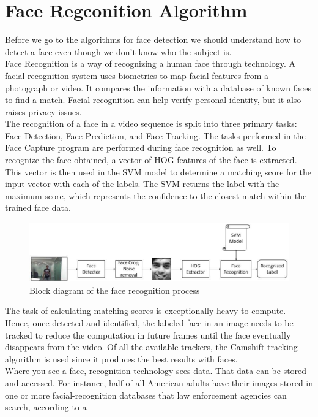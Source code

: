 \section{Face Regconition Algorithm}
    Before we go to the algorithms for face detection we should understand how to detect a face even though we don't know who the subject is. \\
    \vspace{3mm}
    Face Recognition is a way of recognizing a human face through technology. A facial recognition system uses biometrics to map facial features from a photograph or video. 
    It compares the information with a database of known faces to find a match. Facial recognition can help verify personal identity, but it also raises privacy issues. \\ 
    \vspace{3mm}
    The recognition of a face in a video sequence is split into three primary tasks: Face Detection, Face Prediction, and Face Tracking. The tasks performed in the Face Capture 
    program are performed during face recognition as well. To recognize the face obtained, a vector of HOG features of the face is extracted. This vector is then used in the SVM 
    model to determine a matching score for the input vector with each of the labels. The SVM returns the label with the maximum score, which represents the confidence to the 
    closest match within the trained face data. 
    \begin{figure}[H]
        \centering
        \includegraphics[width=0.6\linewidth]{img/face-recognition.jpg}
        \caption{Block diagram of the face recognition process}
    \end{figure}
    The task of calculating matching scores is exceptionally heavy to compute. Hence, once detected and identified, the labeled face in an image needs to be tracked to reduce the 
    computation in future frames until the face eventually disappears from the video. Of all the available trackers, the Camshift tracking algorithm is used since it produces the 
    best results with faces. \\ 
    \vspace{3mm}
    Where you see a face, recognition technology sees data. That data can be stored and accessed. 
    For instance, half of all American adults have their images stored in one or more facial-recognition databases that law enforcement agencies can search, according to a 
